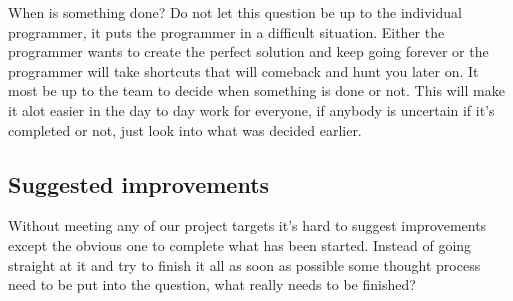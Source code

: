 When is something done?
Do not let this question be up to the individual programmer, it puts the programmer in a difficult situation.
Either the programmer wants to create the perfect solution and keep going forever or the programmer will take shortcuts that will comeback and hunt you later on.
It most be up to the team to decide when something is done or not.
This will make it alot easier in the day to day work for everyone, if anybody is uncertain if it's completed or not, just look into what was decided earlier.
\subsection{Suggested improvements}
Without meeting any of our project targets it's hard to suggest improvements except the obvious one to complete what has been started. 
Instead of going straight at it and try to finish it all as soon as possible some thought process need to be put into the question, what really needs to be finished?

%
%
